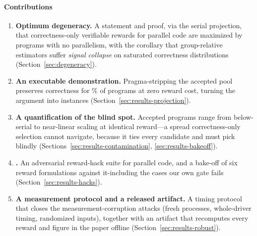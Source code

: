 \paragraph*{Contributions}
\begin{enumerate}
  \item \textbf{Optimum degeneracy.} A statement and proof, via the serial projection, that correctness-only verifiable rewards for parallel code are maximized by programs with no parallelism, with the corollary that group-relative estimators suffer \emph{signal collapse} on saturated correctness distributions (Section~\ref{sec:degeneracy}).
  \item \textbf{An executable demonstration.} Pragma-stripping the accepted pool preserves correctness for \SPRate\% of programs at zero reward cost, turning the argument into instances (Section~\ref{sec:results-projection}).
  \item \textbf{A quantification of the blind spot.} Accepted programs range from below-serial to near-linear scaling at identical reward---a spread correctness-only selection cannot navigate, because it ties every candidate and must pick blindly (Sections~\ref{sec:results-contamination}, \ref{sec:results-bakeoff}).
  \item \textbf{\PG.} An adversarial reward-hack suite for parallel code, and a bake-off of six reward formulations against it-including the cases our own gate fails (Section~\ref{sec:results-hacks}).
  \item \textbf{A measurement protocol and a released artifact.} A timing protocol that closes the measurement-corruption attacks (fresh processes, whole-driver timing, randomized inputs), together with an artifact that recomputes every reward and figure in the paper offline (Section~\ref{sec:results-robust}).
\end{enumerate}